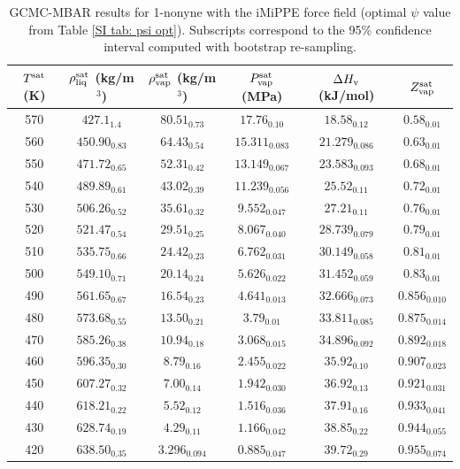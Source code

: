 \documentclass[journal=jctc,manuscript=article]{achemso}
\begin{document}
\begin{table}[htb!]
	\caption{GCMC-MBAR results for 1-nonyne with the iMiPPE force field (optimal $\psi$ value from Table \ref{SI tab: psi opt}). Subscripts correspond to the 95\% confidence interval computed with bootstrap re-sampling.}
	\begin{center}
		\begin{tabular}{|c|c|c|c|c|c|}
			\hline
			$T^{\rm sat}$ (K) & $\rho_{\rm liq}^{\rm sat}$ (kg/m$^3$) & $\rho_{\rm vap}^{\rm sat}$ (kg/m$^3$) & $P_{\rm vap}^{\rm sat}$ (MPa) & $\Delta H_{\rm v}$ (kJ/mol) & $Z_{\rm vap}^{\rm sat}$ \\ \hline
			570 & $427.1_{1.4}$ & $80.51_{0.73}$ & $17.76_{0.10}$ & $18.58_{0.12}$ & $0.58_{0.01}$ \\
			560 & $450.90_{0.83}$ & $64.43_{0.54}$ & $15.311_{0.083}$ & $21.279_{0.086}$ & $0.63_{0.01}$ \\
			550 & $471.72_{0.65}$ & $52.31_{0.42}$ & $13.149_{0.067}$ & $23.583_{0.093}$ & $0.68_{0.01}$ \\
			540 & $489.89_{0.61}$ & $43.02_{0.39}$ & $11.239_{0.056}$ & $25.52_{0.11}$ & $0.72_{0.01}$ \\
			530 & $506.26_{0.52}$ & $35.61_{0.32}$ & $9.552_{0.047}$ & $27.21_{0.11}$ & $0.76_{0.01}$ \\
			520 & $521.47_{0.54}$ & $29.51_{0.25}$ & $8.067_{0.040}$ & $28.739_{0.079}$ & $0.79_{0.01}$ \\
			510 & $535.75_{0.66}$ & $24.42_{0.23}$ & $6.762_{0.031}$ & $30.149_{0.058}$ & $0.81_{0.01}$ \\
			500 & $549.10_{0.71}$ & $20.14_{0.24}$ & $5.626_{0.022}$ & $31.452_{0.059}$ & $0.83_{0.01}$ \\
			490 & $561.65_{0.67}$ & $16.54_{0.23}$ & $4.641_{0.013}$ & $32.666_{0.073}$ & $0.856_{0.010}$ \\
			480 & $573.68_{0.55}$ & $13.50_{0.21}$ & $3.79_{0.01}$ & $33.811_{0.085}$ & $0.875_{0.014}$ \\
			470 & $585.26_{0.38}$ & $10.94_{0.18}$ & $3.068_{0.015}$ & $34.896_{0.092}$ & $0.892_{0.018}$ \\
			460 & $596.35_{0.30}$ & $8.79_{0.16}$ & $2.455_{0.022}$ & $35.92_{0.10}$ & $0.907_{0.023}$ \\
			450 & $607.27_{0.32}$ & $7.00_{0.14}$ & $1.942_{0.030}$ & $36.92_{0.13}$ & $0.921_{0.031}$ \\
			440 & $618.21_{0.22}$ & $5.52_{0.12}$ & $1.516_{0.036}$ & $37.91_{0.16}$ & $0.933_{0.041}$ \\
			430 & $628.74_{0.19}$ & $4.29_{0.11}$ & $1.166_{0.042}$ & $38.85_{0.22}$ & $0.944_{0.055}$ \\
			420 & $638.50_{0.35}$ & $3.296_{0.094}$ & $0.885_{0.047}$ & $39.72_{0.29}$ & $0.955_{0.074}$ \\
			\hline
		\end{tabular}
	\end{center}
\end{table}
\end{document}
